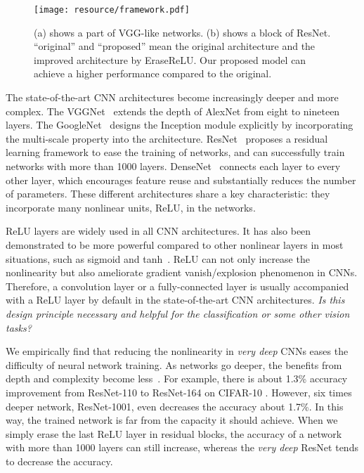 \documentclass[10pt,twocolumn,letterpaper]{article}
\begin{document}
\begin{figure}[t]
\center
\texttt{[image: resource/framework.pdf]}
\caption{(a) shows a part of VGG-like networks. (b) shows a block of ResNet. ``original'' and ``proposed'' mean the original architecture and the improved architecture by EraseReLU.
Our proposed model can achieve a higher performance compared to the original.
}
\label{fig:framework}
\end{figure}

The state-of-the-art CNN architectures become increasingly deeper and more complex. The VGGNet~\cite{simonyan2014very} extends the depth of AlexNet from eight to nineteen layers. The GoogleNet~\cite{szegedy2015going,szegedy2016rethinking} designs the Inception module explicitly by incorporating the multi-scale property into the architecture. ResNet~\cite{he2016deep} proposes a residual learning framework to ease the training of networks, and can successfully train networks with more than 1000 layers. DenseNet~\cite{huang2017densely} connects each layer to every other layer, which encourages feature reuse and substantially reduces the number of parameters. These different architectures share a key characteristic: they incorporate many nonlinear units, ReLU, in the networks.


ReLU layers are widely used in all CNN architectures. It has also been demonstrated to be more powerful compared to other nonlinear layers in most situations, such as sigmoid and tanh~\cite{glorot2011deep}. ReLU can not only increase the nonlinearity but also ameliorate gradient vanish/explosion phenomenon in CNNs. Therefore, a convolution layer or a fully-connected layer is usually accompanied with a ReLU layer by default in the state-of-the-art CNN architectures. \textit{Is this design principle necessary and helpful for the classification or some other vision tasks?}


We empirically find that reducing the nonlinearity in \textit{very deep} CNNs eases the difficulty of neural network training.
As networks go deeper, the benefits from depth and complexity become less~\cite{zagoruyko2017diracnets}.
For example, there is about 1.3\% accuracy improvement from ResNet-110 to ResNet-164 on CIFAR-10 \cite{krizhevsky2009learning}. However, six times deeper network, ResNet-1001, even decreases the accuracy about 1.7\%. In this way, the trained network is far from the capacity it should achieve. When we simply erase the last ReLU layer in residual blocks, the accuracy of a network with more than 1000 layers can still increase, whereas the \textit{very deep} ResNet tends to decrease the accuracy.
\end{document}
